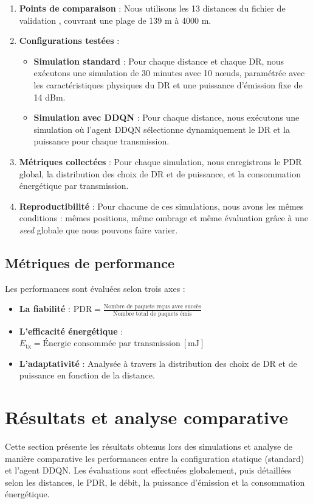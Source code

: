 \begin{enumerate}
	\item \textbf{Points de comparaison} : Nous utilisons les 13 distances du fichier de validation \cite{sanchez_vital_2025_data}, couvrant une plage de 139 m à 4000 m.
	\item \textbf{Configurations testées} :
	\begin{itemize}
		\item \textbf{Simulation standard} : Pour chaque distance et chaque DR, nous exécutons une simulation de 30 minutes avec 10 nœuds, paramétrée avec les caractéristiques physiques du DR et une puissance d'émission fixe de 14 dBm.
		\item \textbf{Simulation avec DDQN} : Pour chaque distance, nous exécutons une simulation où l'agent DDQN sélectionne dynamiquement le DR et la puissance pour chaque transmission.
	\end{itemize}
	\item \textbf{Métriques collectées} : Pour chaque simulation, nous enregistrons le PDR global, la distribution des choix de DR et de puissance, et la consommation énergétique par transmission.
	\item \textbf{Reproductibilité} : Pour chacune de ces simulations, nous avons les mêmes conditions : mêmes positions, même ombrage et même évaluation grâce à une \textit{seed} globale que nous pouvons faire varier.
\end{enumerate}

\subsection{Métriques de performance}
\label{subsec:metriques-eval}

Les performances sont évaluées selon trois axes :

\begin{itemize}
	\item \textbf{La fiabilité} : \(\text{PDR} = \frac{\text{Nombre de paquets reçus avec succès}}{\text{Nombre total de paquets émis}}\)
	\item \textbf{L'efficacité énergétique} : \(E_{\text{tx}} = \text{Énergie consommée par transmission} \ [\text{mJ}]\)
	\item \textbf{L'adaptativité} : Analysée à travers la distribution des choix de DR et de puissance en fonction de la distance.
\end{itemize}

\section{Résultats et analyse comparative}
\label{sec:resultats-analyse}
Cette section présente les résultats obtenus lors des simulations et analyse de manière comparative les performances entre la configuration statique (standard) et l’agent DDQN. Les évaluations sont effectuées globalement, puis détaillées selon les distances, le PDR, le débit, la puissance d’émission et la consommation énergétique.

